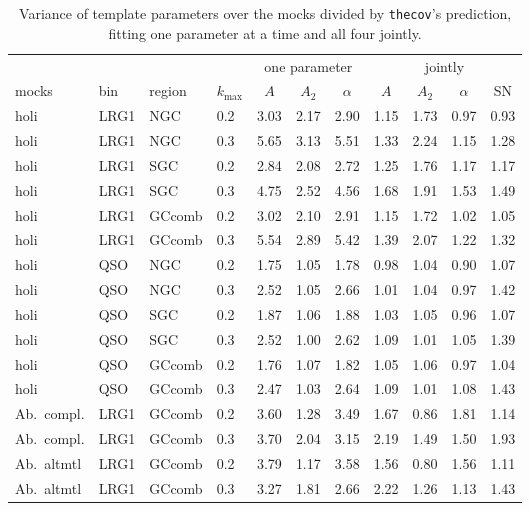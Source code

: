 \documentclass[11pt]{article}
\newcommand{\thecov}{\texttt{thecov}}
\begin{document}
\begin{table}[h]
\centering\small
\begin{tabular}{llll ccc cccc}
\toprule
 & & & & \multicolumn{3}{c}{one parameter} & \multicolumn{4}{c}{jointly}\\
mocks & bin & region & $k_{\max}$ & $A$ & $A_2$ & $\alpha$ & $A$ & $A_2$ & $\alpha$ & SN\\
\midrule
holi & LRG1 & NGC & 0.2 & 3.03 & 2.17 & 2.90 & 1.15 & 1.73 & 0.97 & 0.93\\
holi & LRG1 & NGC & 0.3 & 5.65 & 3.13 & 5.51 & 1.33 & 2.24 & 1.15 & 1.28\\
holi & LRG1 & SGC & 0.2 & 2.84 & 2.08 & 2.72 & 1.25 & 1.76 & 1.17 & 1.17\\
holi & LRG1 & SGC & 0.3 & 4.75 & 2.52 & 4.56 & 1.68 & 1.91 & 1.53 & 1.49\\
holi & LRG1 & GCcomb & 0.2 & 3.02 & 2.10 & 2.91 & 1.15 & 1.72 & 1.02 & 1.05\\
holi & LRG1 & GCcomb & 0.3 & 5.54 & 2.89 & 5.42 & 1.39 & 2.07 & 1.22 & 1.32\\
holi & QSO & NGC & 0.2 & 1.75 & 1.05 & 1.78 & 0.98 & 1.04 & 0.90 & 1.07\\
holi & QSO & NGC & 0.3 & 2.52 & 1.05 & 2.66 & 1.01 & 1.04 & 0.97 & 1.42\\
holi & QSO & SGC & 0.2 & 1.87 & 1.06 & 1.88 & 1.03 & 1.05 & 0.96 & 1.07\\
holi & QSO & SGC & 0.3 & 2.52 & 1.00 & 2.62 & 1.09 & 1.01 & 1.05 & 1.39\\
holi & QSO & GCcomb & 0.2 & 1.76 & 1.07 & 1.82 & 1.05 & 1.06 & 0.97 & 1.04\\
holi & QSO & GCcomb & 0.3 & 2.47 & 1.03 & 2.64 & 1.09 & 1.01 & 1.08 & 1.43\\
Ab.\ compl. & LRG1 & GCcomb & 0.2 & 3.60 & 1.28 & 3.49 & 1.67 & 0.86 & 1.81 & 1.14\\
Ab.\ compl. & LRG1 & GCcomb & 0.3 & 3.70 & 2.04 & 3.15 & 2.19 & 1.49 & 1.50 & 1.93\\
Ab.\ altmtl & LRG1 & GCcomb & 0.2 & 3.79 & 1.17 & 3.58 & 1.56 & 0.80 & 1.56 & 1.11\\
Ab.\ altmtl & LRG1 & GCcomb & 0.3 & 3.27 & 1.81 & 2.66 & 2.22 & 1.26 & 1.13 & 1.43\\
\bottomrule
\end{tabular}
\caption{Variance of template parameters over the mocks divided by \thecov's prediction, fitting one parameter at a time and all four jointly.}
\label{tab:params}
\end{table}
\end{document}
